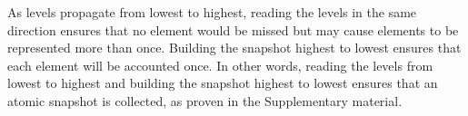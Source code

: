  
As levels propagate from lowest to highest, reading the levels in the same direction ensures that no element would be missed but may cause elements to be represented more than once. Building the snapshot highest to lowest ensures that each element will be accounted once. 
In other words, reading the levels from lowest to highest and building the snapshot highest to lowest ensures that an atomic snapshot is collected, as proven in the Supplementary material. 




